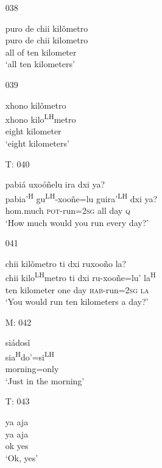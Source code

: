 \begin{itemize}
\item[038]
 
\glll   puro de chii kil\v{o}metro\\
puro de chii kilometro\\
all of ten kilometer\\
\glt `all ten kilometers'\\
 


\item[039]
 
\glll    xhono kil\v{o}metro\\
 xhono kilo\textsuperscript{LH}metro\\
eight kilometer\\
\glt `eight kilometers'
 

 
 
\item[T: 040]
 
pabi\'{a} uxo\'{o}\~{n}elu ira dxi ya?\\
pabia'\textsuperscript{H} gu\textsuperscript{LH}-xoo\~{n}e=lu guira'\textsuperscript{LH} dxi ya?\\
hom.much \textsc{pot}-run=\textsc{2sg} all day \textsc{q}\\
\glt `How much would you run every day?'
 

\item[041]
 
chii kil\v{o}metro ti dxi ruxoo\~{n}o la?\\
 chii kilo\textsuperscript{LH}metro ti dxi ru-xoo\~{n}e=lu' la\textsuperscript{H}\\
 ten kilometer one day \textsc{hab}-run=\textsc{2sg} \textsc{la}\\
\glt `You would run ten kilometers a day?' 
 

\item[M: 042]
 
\glll   si\'{a}dos\v{i}\\
sia\textsuperscript{H}do'=si\textsuperscript{LH}\\
morning=only\\
\glt `Just in the morning'
 

\item[T: 043]
 
\glll   ya aja\\
ya aja\\
ok yes\\
\glt `Ok, yes'
 



\end{itemize}
